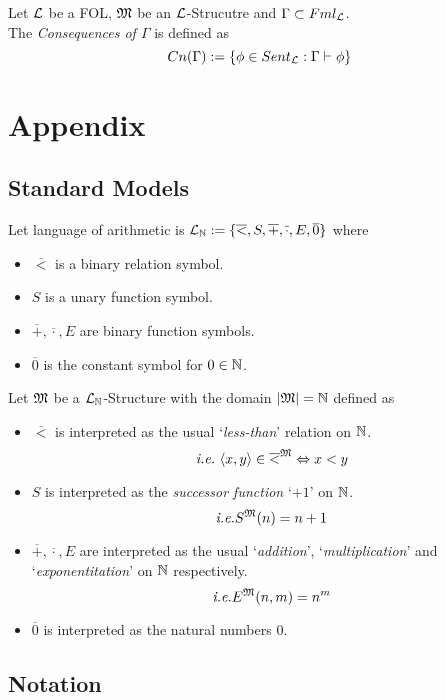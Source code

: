 \documentclass[11pt,a4paper]{article}
\begin{document}
Let $\mathcal{L}$ be a FOL, $\mathfrak{M}$ be an $\mathcal{L}$-Strucutre and $\Gamma\subset Fml_{\mathcal{L}}$.\\
The \textit{Consequences of $\Gamma$} is defined as
\[Cn(\Gamma):=\{\phi\in Sent_{\mathcal{L}}:\Gamma\vdash\phi\}\]

\newpage\setcounter{section}{-1}
\section{Appendix}

\subsection{Standard Models}

Let language of arithmetic is $\mathcal{L}_{\mathbb{N}}:=\{\overline<,S,\overline+,\overline\cdot,E,\overline0\}$ where
\begin{itemize}
	\item $\overline<$ is a binary relation symbol.
	\item $S$ is a unary function symbol.
	\item $\overline+,\overline\cdot,E$ are binary function symbols.
	\item $\overline0$ is the constant symbol for $0\in\mathbb{N}$.
\end{itemize}
Let $\mathfrak{M}$ be a $\mathcal{L}_{\mathbb{N}}$-Structure with the domain $|\mathfrak{M}|=\mathbb{N}$ defined as
\begin{itemize}
	\item $\overline<$ is interpreted as the usual `\textit{less-than}' relation on $\mathbb{N}$.
	$$\ie\ \langle x,y\rangle\in\overline<^\M\Leftrightarrow x<y$$
	\item $S$ is interpreted as the \textit{successor function} `$+1$' on $\mathbb{N}$.
	$$\textit{i.e.} S^{\mathfrak{M}}(n)=n+1$$
	\item $\overline+,\overline\cdot,E$ are interpreted as the usual `\textit{addition}', `\textit{multiplication}' and `\textit{exponentitation}' on $\mathbb{N}$ respectively.
	$$\textit{i.e.} E^{\mathfrak{M}}(n,m)=n^m$$
	\item $\overline0$ is interpreted as the natural numbers $0$.
\end{itemize}

\subsection{Notation}
\end{document}
